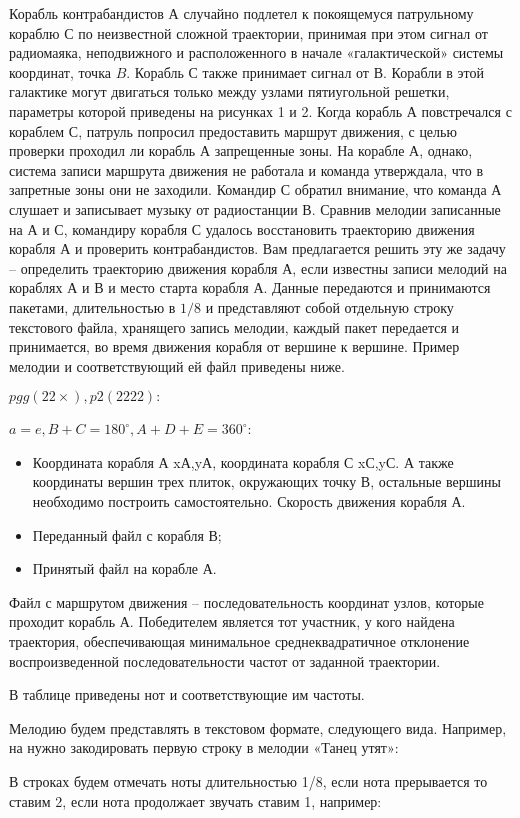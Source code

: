 
Корабль контрабандистов А случайно подлетел к покоящемуся патрульному кораблю С по неизвестной сложной траектории, принимая при этом сигнал от радиомаяка, неподвижного и расположенного в начале «галактической» системы координат, точка $B$. Корабль $С$ также принимает сигнал от $В$. Корабли в этой галактике могут двигаться только между узлами пятиугольной решетки, параметры которой приведены на рисунках 1 и 2. Когда корабль $А$ повстречался с кораблем $С$, патруль попросил предоставить маршрут движения, с целью проверки проходил ли корабль $А$ запрещенные зоны. На корабле $А$, однако, система записи маршрута движения не работала и команда утверждала, что в запретные зоны они не заходили. Командир $С$ обратил внимание, что команда $А$ слушает и записывает музыку от радиостанции $В$. Сравнив мелодии записанные на $А$ и $С$, командиру корабля $С$ удалось восстановить траекторию движения корабля $А$ и проверить контрабандистов. Вам предлагается решить эту же задачу – определить траекторию движения корабля $А$, если известны записи мелодий на кораблях $А$ и $В$ и место старта корабля $А$. Данные передаются и принимаются пакетами, длительностью в $1/8$ и представляют собой отдельную строку текстового файла, хранящего запись мелодии, каждый пакет передается и принимается, во время движения корабля от вершине к вершине. Пример мелодии и соответствующий ей файл приведены ниже.

$pgg (22×), p2 (2222):$

$a = e, B + C = 180^\circ, A + D + E = 360^\circ$:


\begin{itemize}
    \item Координата корабля А {xА,yА}, координата корабля С {xС,yС}. А также координаты вершин трех плиток, окружающих точку В, остальные вершины необходимо построить самостоятельно. Скорость движения корабля А.
    \item Переданный файл с корабля В;
    \item Принятый файл на корабле А.
\end{itemize}

\outputfmtSection

Файл с маршрутом движения – последовательность координат узлов, которые проходит корабль А.
Победителем является тот участник, у кого найдена траектория, обеспечивающая минимальное среднеквадратичное отклонение воспроизведенной последовательности частот от заданной траектории.

В таблице приведены нот и соответствующие им частоты.


\explaneSection

Мелодию будем представлять в текстовом формате, следующего вида. Например, на нужно закодировать первую строку в мелодии «Танец утят»:

В строках будем отмечать ноты длительностью 1/8, если нота прерывается то ставим 2, если нота продолжает звучать ставим 1, например:

